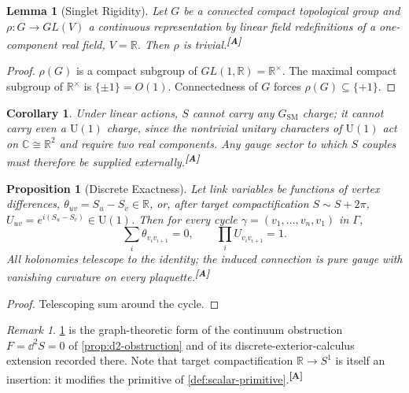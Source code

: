 \documentclass[12pt,a4paper,twoside]{article}
\theoremstyle{plain}
\newtheorem{proposition}[theorem]{Proposition}
\newtheorem{lemma}[theorem]{Lemma}
\newtheorem{corollary}[theorem]{Corollary}
\theoremstyle{definition}
\theoremstyle{remark}
\newtheorem{remark}[theorem]{Remark}
\newcommand{\catmark}[1]{\textsuperscript{\textsf{\textbf{[#1]}}}}
\begin{document}
\begin{lemma}[Singlet Rigidity]
\label{lem:singlet-rigidity}
Let $G$ be a connected compact topological group and
$\rho:G\to GL(V)$ a continuous representation by linear field redefinitions
of a one-component real field, $V=\mathbb{R}$. Then $\rho$ is
trivial.\catmark{A}
\end{lemma}

\begin{proof}
$\rho(G)$ is a compact subgroup of $GL(1,\mathbb{R})=\mathbb{R}^{\times}$.
The maximal compact subgroup of $\mathbb{R}^{\times}$ is $\{\pm 1\}=O(1)$.
Connectedness of $G$ forces $\rho(G)\subseteq\{+1\}$.
\end{proof}

\begin{corollary}
\label{cor:singlet-charge}
Under linear actions, $S$ cannot carry any $G_{\mathrm{SM}}$ charge; it
cannot carry even a $\mathrm{U}(1)$ charge, since the nontrivial unitary
characters of $\mathrm{U}(1)$ act on $\mathbb{C}\cong\mathbb{R}^2$ and
require two real components. Any gauge sector to which $S$ couples must
therefore be supplied externally.\catmark{A}
\end{corollary}

\begin{proposition}[Discrete Exactness]
\label{prop:discrete-exactness}
Let link variables be functions of vertex differences,
$\theta_{uv}=S_u-S_v\in\mathbb{R}$, or, after target compactification
$S\sim S+2\pi$, $U_{uv}=e^{i(S_u-S_v)}\in\mathrm{U}(1)$. Then for every
cycle $\gamma=(v_1,\dots,v_n,v_1)$ in $\Gamma$,
\[
\sum_{i}\theta_{v_i v_{i+1}}=0,
\qquad
\prod_i U_{v_i v_{i+1}} = 1 .
\]
All holonomies telescope to the identity; the induced connection is pure
gauge with vanishing curvature on every plaquette.\catmark{A}
\end{proposition}

\begin{proof}
Telescoping sum around the cycle.
\end{proof}

\begin{remark}
\cref{prop:discrete-exactness} is the graph-theoretic form of the continuum
obstruction $F=\dd^2 S=0$ of \cref{prop:d2-obstruction} and of its
discrete-exterior-calculus extension recorded there. Note that target
compactification $\mathbb{R}\to S^1$ is itself an insertion: it modifies the
primitive of \cref{def:scalar-primitive}.\catmark{A}
\end{remark}
\end{document}
